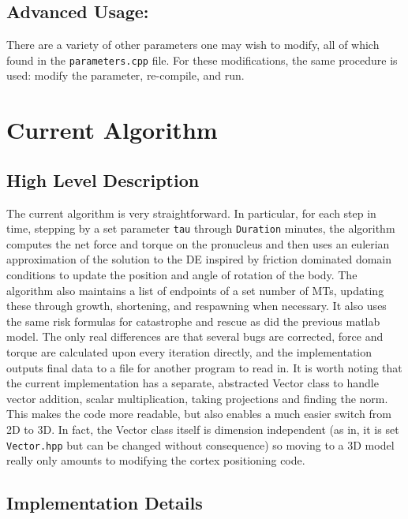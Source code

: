 \documentclass{article}
\begin{document}
  \subsection{Advanced Usage:}
  There are a variety of other parameters one may wish to modify, all of which
  found in the \texttt{parameters.cpp} file. For these modifications, the same
  procedure is used: modify the parameter, re-compile, and run. 
\section{Current Algorithm}
\subsection{High Level Description}
The current algorithm is very straightforward. In particular, for each step in
time, stepping by a set parameter \texttt{tau} through \texttt{Duration}
minutes, the algorithm computes the net force and torque on the pronucleus and
then uses an eulerian approximation of the solution to the DE inspired by
friction dominated domain conditions to update the position and angle of
rotation of the body. The algorithm also maintains a list of endpoints of a set
number of MTs, updating these through growth, shortening, and respawning when
necessary. It also uses the same risk formulas for catastrophe and rescue as did
the previous matlab model. The only real differences are that several bugs are
corrected, force and torque are calculated upon every iteration directly, and
the implementation outputs final data to a file for another program to read in.
It is worth noting that the current implementation has a separate, abstracted
Vector class to handle vector addition, scalar multiplication, taking
projections and finding the norm. This makes the code more readable, but also
enables a much easier switch from 2D to 3D. In fact, the Vector class itself is
dimension independent (as in, it is set \texttt{Vector.hpp} but can be changed
without consequence) so moving to a 3D model really only amounts to modifying
the cortex positioning code. 
\subsection{Implementation Details}
\end{document}
